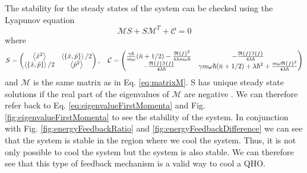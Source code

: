 The stability for the steady states of the system can be checked using the Lyapunov equation
\begin{equation}
    \mathcal{M} S + S \mathcal{M}^T  + \mathcal{C} = 0
\end{equation}
where 
\begin{equation}
    S = 
    \begin{pmatrix}
    \expval{\xop^2} & \expval{\acomm{\xop}{\pop}}/2\\
    \expval{\acomm{\xop}{\pop}}/2 & \expval{\pop^2}    
    \end{pmatrix},
    \quad
    \mathcal{C} =
    \begin{pmatrix}
        \frac{\gamma \hbar}{m \omega} (\nbar + 1/2) - \frac{\re{f}^2}{4\lambda m \omega \hbar} & -\frac{\re{f} \im{f}}{4 \lambda \hbar}\\
        -\frac{\re{f} \im{f}}{4 \lambda \hbar} & \gamma m \omega \hbar (\nbar + 1/2) + \lambda \hbar^2 +\frac{m \omega \re{f}^2}{4 \lambda \hbar}\\
    \end{pmatrix}
\end{equation}
and $\mathcal{M}$ is the same matrix as in Eq. \eqref{eq:matrixM}. S has unique steady state solutions if the real part of the eigenvalues of $\mathcal{M}$ are negative \cite{Purkayastha:2022}. We can therefore refer back to Eq. \eqref{eq:eigenvalueFirstMomenta} and Fig. \ref{fig:eigenvalueFirstMomenta} to see the stability of the system. In conjunction with Fig. \ref{fig:energyFeedbackRatio} and \ref{fig:energyFeedbackDifference} we can see that the system is stable in the region where we cool the system. Thus, it is not only possible to cool the system but the system is also stable. We can therefore see that this type of feedback mechanism is a valid way to cool a QHO.